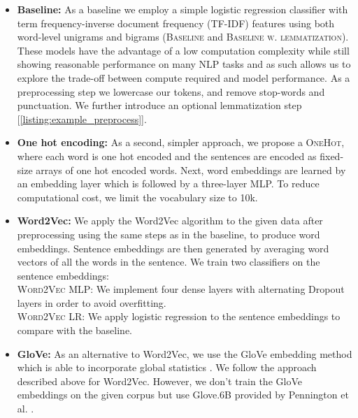 \begin{itemize}[leftmargin=0cm]
    \setlength\itemsep{0.6em}
    \item[]
    \textbf{Baseline:}
    As a baseline we employ a simple logistic regression classifier with term frequency-inverse document frequency (TF-IDF) features using both word-level unigrams and bigrams (\textsc{Baseline} and \textsc{Baseline w. lemmatization}).
    These models have the advantage of a low computation complexity while still showing reasonable performance on many NLP tasks and as such allows us to explore the trade-off between compute required and model performance.
    As a preprocessing step we lowercase our tokens, and remove stop-words and punctuation. We further introduce an optional lemmatization step [\autoref{listing:example_preprocess}].
    
    \item[]
    \textbf{One hot encoding:}
    As a second, simpler approach, we
     propose a \textsc{OneHot}, where each word is one hot encoded and the sentences are encoded as fixed-size arrays of one hot encoded words. Next, word embeddings are learned by an embedding layer which is followed by a three-layer MLP. To reduce computational cost, we limit the vocabulary size to 10k.

    \item[]
    \textbf{Word2Vec:}
    We apply the Word2Vec algorithm \citep{word2vec2013} to the given data after preprocessing using the same steps as in the baseline, to produce word embeddings. Sentence embeddings are then generated by averaging word vectors of all the words in the sentence. We train two classifiers on the sentence embeddings:\\
    \textsc{Word2Vec MLP:} We implement four dense layers with alternating Dropout layers in order to avoid overfitting.\\
    \textsc{Word2Vec LR:} We apply logistic regression to  the sentence embeddings to compare with the baseline.

    \item[]
    \textbf{GloVe:} As an alternative to Word2Vec, we use the GloVe embedding method which is able to incorporate global statistics \cite{pennington2014glove}. We follow the approach described above for Word2Vec. However, we don't train the GloVe embeddings on the given corpus but use Glove.6B provided by Pennington et al. \cite{pennington2014glove}.
    

\end{itemize}

